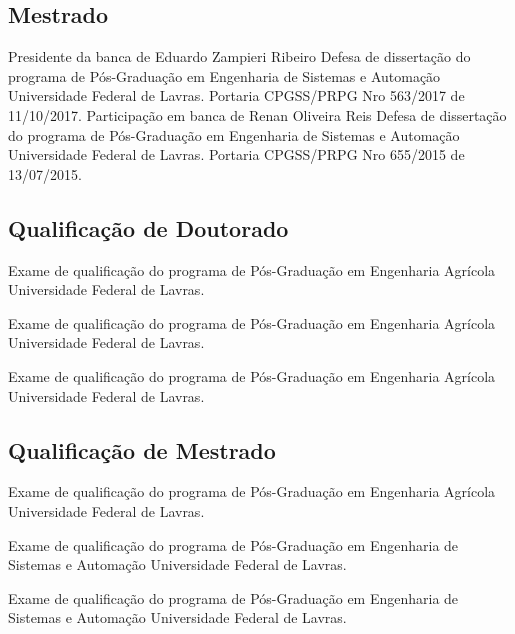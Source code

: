 \documentclass[11pt,a4paper,sans]{moderncv} %
\begin{document}
\subsection{Mestrado}
			{Presidente da banca de Eduardo Zampieri Ribeiro}
			{Defesa de dissertação do programa de Pós-Graduação em Engenharia de Sistemas e Automação}{}
			{Universidade Federal de Lavras. Portaria CPGSS/PRPG Nro 563/2017 de 11/10/2017.}
			{Participação em banca de Renan Oliveira Reis}
			{Defesa de dissertação do programa de Pós-Graduação em Engenharia de Sistemas e Automação}{}
			{Universidade Federal de Lavras. Portaria CPGSS/PRPG Nro 655/2015 de 13/07/2015.}

\subsection{Qualificação de Doutorado}
			{}
			{Exame de qualificação do programa de Pós-Graduação em Engenharia Agrícola}{}
			{Universidade Federal de Lavras.}

			{}
			{Exame de qualificação do programa de Pós-Graduação em Engenharia Agrícola}{}
			{Universidade Federal de Lavras.}

			{}
			{Exame de qualificação do programa de Pós-Graduação em Engenharia Agrícola}{}
			{Universidade Federal de Lavras.}
			
\subsection{Qualificação de Mestrado}
			{}
			{Exame de qualificação do programa de Pós-Graduação em Engenharia Agrícola}{}
			{Universidade Federal de Lavras.}

			{}
			{Exame de qualificação do programa de Pós-Graduação em Engenharia de Sistemas e Automação}{}
			{Universidade Federal de Lavras.}

			{}
			{Exame de qualificação do programa de Pós-Graduação em Engenharia de Sistemas e Automação}{}
			{Universidade Federal de Lavras.}
\end{document}

